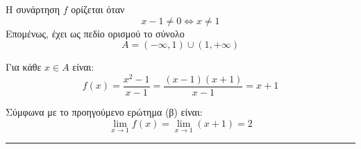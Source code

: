 \begin{alist}
\item Η συνάρτηση $f$ ορίζεται όταν
\[ x - 1 \neq 0 \Leftrightarrow x \neq 1 \]
Επομένως, έχει ως πεδίο ορισμού το σύνολο
\[ A = (-\infty, 1) \cup (1, +\infty) \]
\item Για κάθε $x \in A$ είναι:
\[ f(x) = \frac{x^2 - 1}{x - 1} = \frac{(x - 1)(x + 1)}{x - 1} = x + 1 \]
\item Σύμφωνα με το προηγούμενο ερώτημα (β) είναι:
\[ \lim\limits_{x \to 1} f(x) = \lim\limits_{x \to 1} (x + 1) = 2 \]
\end{alist}
\vspace{6mm}
\noindent\rule{\textwidth}{0.4pt}
\vspace{6mm}

